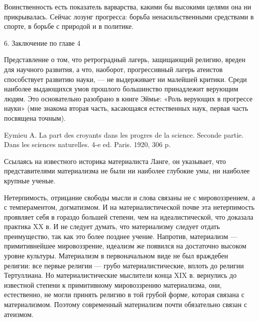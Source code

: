 Воинственность есть  показатель варварства, какими бы  высокими целями
она ни прикрывалась. Сейчас лозунг прогресса: борьба ненасильственными
средствами в спорте, в борьбе с природой и в политике.

6. Заключение по главе 4

Представление  о том,  что  ретроградный  лагерь, защищающий  религию,
вреден  для   научного  развития,   а  что,   наоборот,  прогрессивный
лагерь  атеистов способствует  развитию науки,  --- не  выдерживает ни
малейшей критики. Среди наиболее  выдающихся умов прошлого большинство
принадлежит  верующим  людям.  Это   основательно  разобрано  в  книге
Эймье: «Роль  верующих в прогрессе  науки» (мне знакома  вторая часть,
касающаяся естественных наук, первая часть посвящена точным).

Eymieu A. La part des croyants dans les progres de la science. Seconde
partie. Dans les sciences naturelles. 4-e ed. Paris. 1920, 306 p.

Ссылаясь на известного историка  материалиста Ланге, он указывает, что
представителями  материализма не  были  ни наиболее  глубокие умы,  ни
наиболее крупные ученые.

Нетерпимость,   отрицание   свободы   мысли   и   слова   связаны   не
с   мировоззрением,    а   с   темпераментом,   догматизмом.    И   на
материалистической  почве эта  нетерпимость проявляет  себя в  гораздо
большей степени, чем на идеалистической, что доказала практика XX в. И
не следует  думать, что материализму следует  отдать преимущество, так
как это более позднее учение. Напротив, материализм --- примитивнейшее
мировоззрение,  идеализм  же  появился на  достаточно  высоком  уровне
культуры. Материализм в первоначальном  виде не был враждебен религии:
все  первые религии  --- грубо  материалистические, вплоть  до религии
Тертуллиана. Но  материалистические мыслители  конца XIX  в. вернулись
до  известной  степени   к  примитивному  мировоззрению  материализма,
они,  естественно,  не  могли  принять религию  в  той  грубой  форме,
которая связана с материализмом. Поэтому современный материализм почти
обязательно связан с атеизмом.

